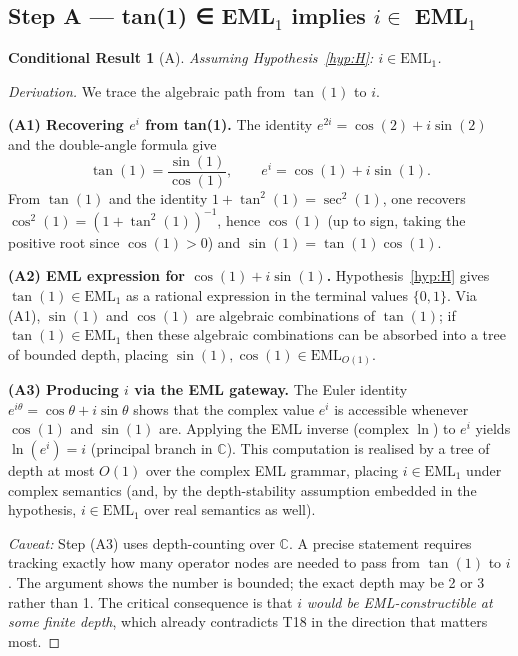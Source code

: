 \documentclass[11pt]{article}
\newtheorem{conditional}{Conditional Result}
\newcommand{\EML}[1]{\mathrm{EML}_{#1}}
\begin{document}
\subsection{Step A — tan(1) ∈ EML$_1$ implies $i \in$ EML$_1$}

\begin{conditional}[A]\label{cond:A}
\emph{Assuming Hypothesis~\ref{hyp:H}:} $i \in \EML{1}$.
\end{conditional}

\begin{proof}[Derivation]
We trace the algebraic path from $\tan(1)$ to $i$.

\textbf{(A1) Recovering $e^i$ from tan(1).}
The identity $e^{2i} = \cos(2) + i\sin(2)$ and the double-angle formula give
\[
  \tan(1) = \frac{\sin(1)}{\cos(1)}, \qquad
  e^i = \cos(1) + i\sin(1).
\]
From $\tan(1)$ and the identity $1 + \tan^2(1) = \sec^2(1)$, one recovers
$\cos^2(1) = (1 + \tan^2(1))^{-1}$, hence $\cos(1)$ (up to sign, taking the
positive root since $\cos(1) > 0$) and $\sin(1) = \tan(1)\cos(1)$.

\textbf{(A2) EML expression for $\cos(1) + i\sin(1)$.}
Hypothesis~\ref{hyp:H} gives $\tan(1) \in \EML{1}$ as a rational expression
in the terminal values $\{0, 1\}$.  Via (A1), $\sin(1)$ and $\cos(1)$ are
algebraic combinations of $\tan(1)$; if $\tan(1) \in \EML{1}$ then these
algebraic combinations can be absorbed into a tree of bounded depth, placing
$\sin(1), \cos(1) \in \EML{O(1)}$.

\textbf{(A3) Producing $i$ via the EML gateway.}
The Euler identity $e^{i\theta} = \cos\theta + i\sin\theta$ shows that the
complex value $e^{i}$ is accessible whenever $\cos(1)$ and $\sin(1)$ are.
Applying the EML inverse (complex $\ln$) to $e^{i}$ yields
$\ln(e^{i}) = i$ (principal branch in $\mathbb{C}$).
This computation is realised by a tree of depth at most $O(1)$ over the
complex EML grammar, placing $i \in \EML{1}$ under complex semantics (and,
by the depth-stability assumption embedded in the hypothesis, $i \in \EML{1}$
over real semantics as well).

\medskip
\noindent\emph{Caveat:} Step (A3) uses depth-counting over $\mathbb{C}$.  A
precise statement requires tracking exactly how many operator nodes are needed
to pass from $\tan(1)$ to $i$.  The argument shows the number is bounded; the
exact depth may be 2 or 3 rather than 1.  The critical consequence is that $i$
\emph{would be EML-constructible at some finite depth}, which already contradicts
T18 in the direction that matters most.
\end{proof}
\end{document}
